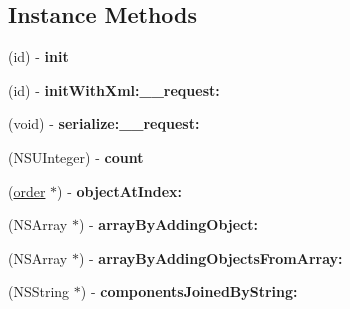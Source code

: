 \subsection*{Instance Methods}
\begin{DoxyCompactItemize}
\item 
\hypertarget{interfaceget_open_orders_by_g_l_n_response_a73ac7aacd8acccbcd124dd191c60167d}{}(id) -\/ {\bfseries init}\label{interfaceget_open_orders_by_g_l_n_response_a73ac7aacd8acccbcd124dd191c60167d}

\item 
\hypertarget{interfaceget_open_orders_by_g_l_n_response_a0cd9270f26ebd5db9d6944505619f1b5}{}(id) -\/ {\bfseries init\+With\+Xml\+:\+\_\+\+\_\+request\+:}\label{interfaceget_open_orders_by_g_l_n_response_a0cd9270f26ebd5db9d6944505619f1b5}

\item 
\hypertarget{interfaceget_open_orders_by_g_l_n_response_a5e377361491bac0e2714bf30be495e3b}{}(void) -\/ {\bfseries serialize\+:\+\_\+\+\_\+request\+:}\label{interfaceget_open_orders_by_g_l_n_response_a5e377361491bac0e2714bf30be495e3b}

\item 
\hypertarget{interfaceget_open_orders_by_g_l_n_response_ab6728cc643de869854fc6594df5a4b58}{}(N\+S\+U\+Integer) -\/ {\bfseries count}\label{interfaceget_open_orders_by_g_l_n_response_ab6728cc643de869854fc6594df5a4b58}

\item 
\hypertarget{interfaceget_open_orders_by_g_l_n_response_a02adfddd1de1eee53ee846cbf1ce9a6a}{}(\hyperlink{interfaceorder}{order} $\ast$) -\/ {\bfseries object\+At\+Index\+:}\label{interfaceget_open_orders_by_g_l_n_response_a02adfddd1de1eee53ee846cbf1ce9a6a}

\item 
\hypertarget{interfaceget_open_orders_by_g_l_n_response_ab47bc1ad6260c09f872f5eac252f2839}{}(N\+S\+Array $\ast$) -\/ {\bfseries array\+By\+Adding\+Object\+:}\label{interfaceget_open_orders_by_g_l_n_response_ab47bc1ad6260c09f872f5eac252f2839}

\item 
\hypertarget{interfaceget_open_orders_by_g_l_n_response_a1710a3686b38d4dcb2852e2133f24439}{}(N\+S\+Array $\ast$) -\/ {\bfseries array\+By\+Adding\+Objects\+From\+Array\+:}\label{interfaceget_open_orders_by_g_l_n_response_a1710a3686b38d4dcb2852e2133f24439}

\item 
\hypertarget{interfaceget_open_orders_by_g_l_n_response_a443a8704590b4c84966da4a950492fd3}{}(N\+S\+String $\ast$) -\/ {\bfseries components\+Joined\+By\+String\+:}\label{interfaceget_open_orders_by_g_l_n_response_a443a8704590b4c84966da4a950492fd3}


\end{DoxyCompactItemize}
